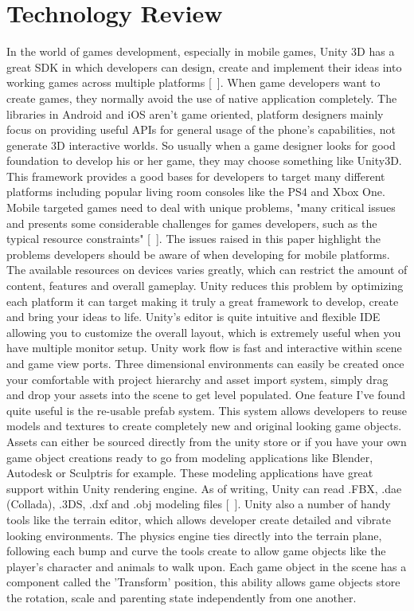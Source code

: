 \chapter{Technology Review}
In the world of games development, especially in mobile games, Unity 3D has a great SDK in which developers can design, create and implement their ideas into working games across multiple platforms [~\cite{Unity3D}]. When game developers want to create games, they normally avoid the use of native application completely. The libraries in Android and iOS aren't game oriented, platform designers mainly focus on providing useful APIs for general usage of the phone's capabilities, not generate 3D interactive worlds. So usually when a game designer looks for good foundation to develop his or her game, they may choose something like Unity3D. This framework provides a good bases for developers to target many different platforms including popular living room consoles like the PS4 and Xbox One. Mobile targeted games need to deal with unique problems, "many critical issues and presents some considerable challenges for games developers, such as the typical resource constraints" [~\cite{RAD-Game-Development}]. The issues raised in this paper highlight the problems developers should be aware of when developing for mobile platforms. The available resources on devices varies greatly, which can restrict the amount of content, features and overall gameplay. Unity reduces this problem by optimizing each platform it can target making it truly a great framework to develop, create and bring your ideas to life.
Unity's editor is quite intuitive and flexible IDE allowing you to customize the overall layout, which is extremely useful when you have multiple monitor setup. Unity work flow is fast and interactive within scene and game view ports. Three dimensional environments can easily be created once your comfortable with project hierarchy and asset import system, simply drag and drop your assets into the scene to get level populated. One feature I've found quite useful is the re-usable prefab system. This system allows developers to reuse models and textures to create completely new and original looking game objects. Assets can either be sourced directly from the unity store or if you have your own game object creations ready to go from modeling applications like Blender, Autodesk or Sculptris for example. These modeling applications have great support within Unity rendering engine. As of writing, Unity can read .FBX, .dae (Collada), .3DS, .dxf and .obj modeling files [~\cite{Unity-Models-Support}]. Unity also a number of handy tools like the terrain editor, which allows developer create detailed and vibrate looking environments. The physics engine ties directly into the terrain plane, following each bump and curve the tools create to allow game objects like the player's character and animals to walk upon. Each game object in the scene has a component called the 'Transform' position, this ability allows game objects store the rotation, scale and parenting state independently from one another.

